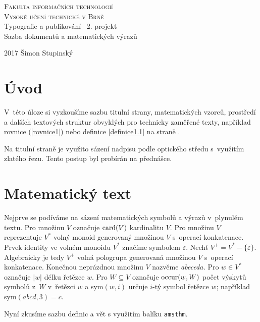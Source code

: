 \documentclass[czech,a4paper,twocolumn,11pt]{article}
\theoremstyle{definition}
\theoremstyle{definition}
\theoremstyle{definition}
\begin{document}
\begin{titlepage} 
\begin{center} 
{\Huge \textsc{Fakulta informačních technologií \\\vspace{0.0mm} Vysoké učení technické v Brně}}\\ 
{\LARGE Typografie a publikování\,--\,2. projekt \\\vspace{0.5mm} Sazba dokumentů a matematických výrazů}\\
\end{center} 
{\Large {2017 \hfill Šimon Stupinský}} 
\end{titlepage}

\section*{Úvod} 
V~této úloze si vyzkoušíme sazbu titulní strany, matematických vzorců, prostředí a dalších textových struktur obvyklých pro technicky zaměřené texty, například rovnice (\ref{rovnice1}) nebo definice \ref{definice1.1} na straně \pageref{definice1.1}.

Na titulní straně je využito sázení nadpisu podle optického středu s~využitím zlatého řezu. Tento postup byl probírán na přednášce.

\section{Matematický text}
Nejprve se podíváme na sázení matematických symbolů a výrazů v~plynulém textu. Pro množinu $V$ označuje $\textnormal{card}(V)$ kardinalitu $V$. Pro množinu $V$ reprezentuje $V^*$ volný monoid generovaný množinou $V$ s~operací konkatenace. Prvek identity ve volném monoidu $V^*$ značíme symbolem $\varepsilon$.
Nechť $V^+=V^*- \{ \varepsilon \}$. Algebraicky je tedy $V^+$ volná pologrupa generovaná množinou $V$ s~operací konkatenace. Konečnou neprázdnou množinu $V$ nazvěme \emph{abeceda.} Pro $w\in V^*$ označuje $|w|$ délku řetězce $w$. Pro $W \subseteq V$ označuje $\textnormal{occur}(w,W)$ počet výskytů symbolů z~$W$ v~řetězci $w$ a sym$(w,i)$ určuje $i$-tý symbol řetězce $w$; například sym$(abcd,3)=c$.

Nyní zkusíme sazbu definic a vět s využitím balíku \texttt{amsthm}.
\end{document}
